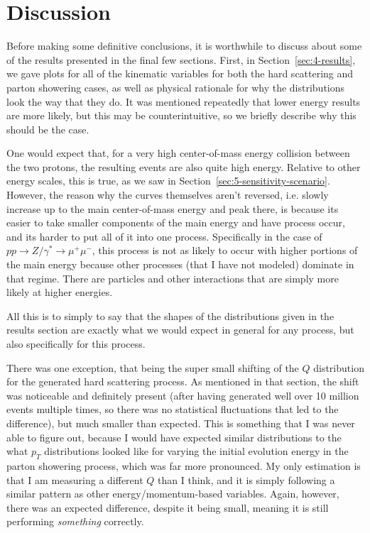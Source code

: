 \section{Discussion}\label{sec:7-discussion-conclusion}

Before making some definitive conclusions, it is worthwhile to discuss about some of the results presented in the final few sections. First, in Section~\ref{sec:4-results}, we gave plots for all of the kinematic variables for both the hard scattering and parton showering cases, as well as physical rationale for why the distributions look the way that they do. It was mentioned repeatedly that lower energy results are more likely, but this may be counterintuitive, so we briefly describe why this should be the case.

One would expect that, for a very high center-of-mass energy collision between the two protons, the resulting events are also quite high energy. Relative to other energy scales, this is true, as we saw in Section~\ref{sec:5-sensitivity-scenario}. However, the reason why the curves themselves aren't reversed, i.e. slowly increase up to the main center-of-mass energy and peak there, is because its easier to take smaller components of the main energy and have process occur, and its harder to put all of it into one process. Specifically in the case of $pp \rightarrow Z/\gamma^* \rightarrow \mu^+\mu^-$, this process is not as likely to occur with higher portions of the main energy because other processes (that I have not modeled) dominate in that regime. There are particles and other interactions that are simply more likely at higher energies.

All this is to simply to say that the shapes of the distributions given in the results section are exactly what we would expect in general for any process, but also specifically for this process.

There was one exception, that being the super small shifting of the $Q$ distribution for the generated hard scattering process. As mentioned in that section, the shift was noticeable and definitely present (after having generated well over 10 million events multiple times, so there was no statistical fluctuations that led to the difference), but much smaller than expected. This is something that I was never able to figure out, because I would have expected similar distributions to the what $p_T$ distributions looked like for varying the initial evolution energy in the parton showering process, which was far more pronounced. My only estimation is that I am measuring a different $Q$ than I think, and it is simply following a similar pattern as other energy/momentum-based variables. Again, however, there was an expected difference, despite it being small, meaning it is still performing \textit{something} correctly.




